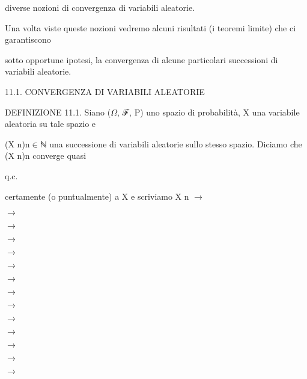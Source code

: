 \documentclass[a4paper,portrait,12pt]{article}
\begin{document}
\begin{flushleft}
diverse nozioni di convergenza di variabili aleatorie.
\end{flushleft}


\begin{flushleft}
Una volta viste queste nozioni vedremo alcuni risultati (i teoremi limite) che ci garantiscono
\end{flushleft}


\begin{flushleft}
sotto opportune ipotesi, la convergenza di alcune particolari successioni di variabili aleatorie.
\end{flushleft}





\begin{flushleft}
11.1. CONVERGENZA DI VARIABILI ALEATORIE
\end{flushleft}


\begin{flushleft}
DEFINIZIONE 11.1. Siano ($\Omega$, ℱ, P) uno spazio di probabilit\`{a}, X una variabile aleatoria su tale spazio e
\end{flushleft}


\begin{flushleft}
(X n)n$\in$ℕ una successione di variabili aleatorie sullo stesso spazio. Diciamo che (X n)n converge quasi
\end{flushleft}


\begin{flushleft}
q.c.
\end{flushleft}


\begin{flushleft}
certamente (o puntualmente) a X e scriviamo X n $\rightarrow$
\end{flushleft}


$\rightarrow$


$\rightarrow$


$\rightarrow$


$\rightarrow$


$\rightarrow$


$\rightarrow$


$\rightarrow$


$\rightarrow$


$\rightarrow$


$\rightarrow$


$\rightarrow$


$\rightarrow$


$\rightarrow$
\end{document}
